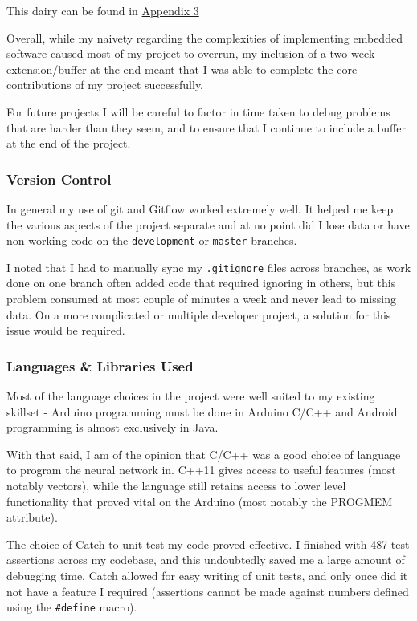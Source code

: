 \documentclass[a4paper]{article}
\begin{document}
This dairy can be found in \hyperref[subsec:a3_pd]{Appendix 3}

Overall, while my naivety regarding the complexities of implementing embedded software caused most of my project to overrun, my inclusion of a two week extension/buffer at the end meant that I was able to complete the core contributions of my project successfully. 

For future projects I will be careful to factor in time taken to debug problems that are harder than they seem, and to ensure that I continue to include a buffer at the end of the project.

\subsubsection{Version Control}
\label{subsubsec:ev_pm_versioncontrol}

In general my use of git and Gitflow worked extremely well. It helped me keep the various aspects of the project separate and at no point did I lose data or have non working code on the \lstinline{development} or \lstinline{master} branches. 

I noted that I had to manually sync my \lstinline{.gitignore} files across branches, as work done on one branch often added code that required ignoring in others, but this problem consumed at most couple of minutes a week and never lead to missing data. On a more complicated or multiple developer project, a solution for this issue would be required.

\subsubsection{Languages \& Libraries Used}
\label{subsubsec:ev_pm_languages}

Most of the language choices in the project were well suited to my existing skillset - Arduino programming must be done in Arduino C/C++ and Android programming is almost exclusively in Java. 

With that said, I am of the opinion that C/C++ was a good choice of language to program the neural network in. C++11 gives access to useful features (most notably vectors), while the language still retains access to lower level functionality that proved vital on the Arduino (most notably the PROGMEM attribute).

The choice of Catch to unit test my code proved effective. I finished with 487 test assertions across my codebase, and this undoubtedly saved me a large amount of debugging time. Catch allowed for easy writing of unit tests, and only once did it not have a feature I required (assertions cannot be made against numbers defined using the \lstinline{#define} macro).
\end{document}
